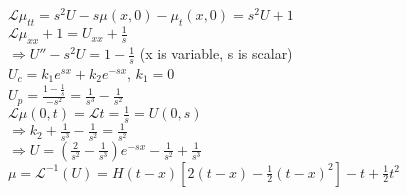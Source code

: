 \documentclass[10pt]{article}
\newcommand{\Lap}{\mathcal{L}}
\begin{document}
\begin{multicols}{2}
\begin{enumerate}
		$\Lap{\mu_{tt}} = s^2U-s\mu(x,0) - \mu_t(x,0) = s^2U + 1$\\
		$\Lap{\mu_{xx} + 1} = U_{xx} + \frac{1}{s}$\\
		$\Rightarrow U'' - s^2U = 1 - \frac{1}{s}$ (x is variable, s is scalar)\\
		$U_c = k_1e^{sx} + k_2e^{-sx}$, $k_1 = 0$\\
		$U_p = \frac{1 - \frac{1}{s}}{-s^2} = \frac{1}{s^3} - \frac{1}{s^2}$\\
		$\Lap{\mu(0,t)} = \Lap{t} = \frac{1}{s} = U(0,s)$\\
		$\Rightarrow k_2 + \frac{1}{s^3} - \frac{1}{s^2} = \frac{1}{s^2}$\\
		$\Rightarrow U = (\frac{2}{s^2} - \frac{1}{s^3})e^{-sx} - \frac{1}{s^2} + \frac{1}{s^3}$\\
		$\mu = \Lap^{-1}(U) = H(t-x)[2(t-x)-\frac{1}{2}(t-x)^2] - t + \frac{1}{2}t^2$ 
		
	\end{enumerate}
\end{multicols}
\end{document}
